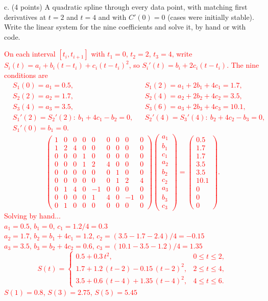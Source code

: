 \documentclass[11pt]{article}
\begin{document}
c. (4 points) A quadratic spline through every data point, with matching first derivatives at $t=2$
and $t=4$ and with $C'(0)=0$ (cases were initially stable). Write the linear system for the nine coefficients and solve it, by hand or with code.

\textcolor{red}{
On each interval $[t_i, t_{i+1}]$ with $t_1 = 0$, $t_2 = 2$, $t_3 = 4$, write $S_i(t) = a_i + b_i(t - t_i) + c_i(t - t_i)^2$,
so $S_i'(t) = b_i + 2c_i(t - t_i)$. The nine conditions are
\begin{align*}
&S_1(0) = a_1 = 0.5, & &S_1(2) = a_1 + 2b_1 + 4c_1 = 1.7, \\
&S_2(2) = a_2 = 1.7, & &S_2(4) = a_2 + 2b_2 + 4c_2 = 3.5, \\
&S_3(4) = a_3 = 3.5, & &S_3(6) = a_3 + 2b_3 + 4c_3 = 10.1, \\
&S_1'(2) = S_2'(2):\ b_1 + 4c_1 - b_2 = 0, & &S_2'(4) = S_3'(4):\ b_2 + 4c_2 - b_3 = 0, \\
&S_1'(0) = b_1 = 0.
\end{align*}
\[
\begin{pmatrix}
1&0&0&0&0&0&0&0&0\\
1&2&4&0&0&0&0&0&0\\
0&0&0&1&0&0&0&0&0\\
0&0&0&1&2&4&0&0&0\\
0&0&0&0&0&0&1&0&0\\
0&0&0&0&0&0&1&2&4\\
0&1&4&0&-1&0&0&0&0\\
0&0&0&0&1&4&0&-1&0\\
0&1&0&0&0&0&0&0&0
\end{pmatrix}
\begin{pmatrix} a_1\\ b_1\\ c_1\\ a_2\\ b_2\\ c_2\\ a_3\\ b_3\\ c_3 \end{pmatrix}
=
\begin{pmatrix} 0.5\\ 1.7\\ 1.7\\ 3.5\\ 3.5\\ 10.1\\ 0\\ 0\\ 0 \end{pmatrix}.
\]
Solving by hand...\\
$a_1 = 0.5$, $b_1 = 0$, $c_1 = 1.2/4 = 0.3$\\
$a_2 = 1.7$, $b_2 = b_1 + 4c_1 = 1.2$, $c_2 = (3.5 - 1.7 - 2.4)/4 = -0.15$\\
$a_3 = 3.5$, $b_3 = b_2 + 4c_2 = 0.6$, $c_3 = (10.1 - 3.5 - 1.2)/4 = 1.35$
\[
S(t) = \begin{cases}
0.5 + 0.3\,t^2, & 0 \le t \le 2, \\
1.7 + 1.2\,(t-2) - 0.15\,(t-2)^2, & 2 \le t \le 4, \\
3.5 + 0.6\,(t-4) + 1.35\,(t-4)^2, & 4 \le t \le 6.
\end{cases}
\]
$S(1) = 0.8$, $S(3) = 2.75$, $S(5) = 5.45$
}
\end{document}
